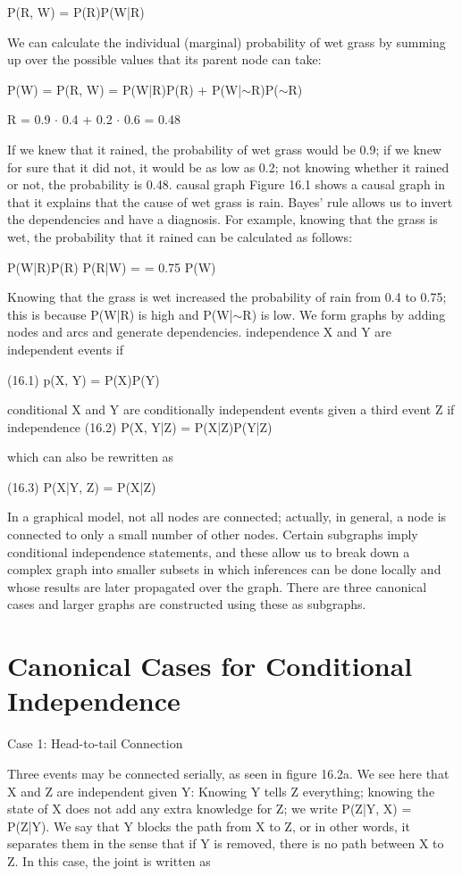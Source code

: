 P(R, W) = P(R)P(W|R)

We can calculate the individual (marginal) probability of wet grass by summing up over the possible values that its parent node can take:

P(W) = P(R, W) = P(W|R)P(R) + P(W|$\sim$R)P($\sim$R)

R = 0.9 $\cdot$ 0.4 + 0.2 $\cdot$ 0.6 = 0.48

If we knew that it rained, the probability of wet grass would be 0.9; if we knew for sure that it did not, it would be as low as 0.2; not knowing whether it rained or not, the probability is 0.48. causal graph Figure 16.1 shows a causal graph in that it explains that the cause of wet grass is rain. Bayes’ rule allows us to invert the dependencies and have a diagnosis. For example, knowing that the grass is wet, the probability that it rained can be calculated as follows:

P(W|R)P(R) P(R|W) = = 0.75 P(W)

Knowing that the grass is wet increased the probability of rain from 0.4 to 0.75; this is because P(W|R) is high and P(W|$\sim$R) is low. We form graphs by adding nodes and arcs and generate dependencies. independence X and Y are independent events if

(16.1) p(X, Y) = P(X)P(Y)

conditional X and Y are conditionally independent events given a third event Z if independence (16.2) P(X, Y|Z) = P(X|Z)P(Y|Z)

which can also be rewritten as

(16.3) P(X|Y, Z) = P(X|Z)

In a graphical model, not all nodes are connected; actually, in general, a node is connected to only a small number of other nodes. Certain subgraphs imply conditional independence statements, and these allow us to break down a complex graph into smaller subsets in which inferences can be done locally and whose results are later propagated over the graph. There are three canonical cases and larger graphs are constructed using these as subgraphs.

\section{Canonical Cases for Conditional Independence}

Case 1: Head-to-tail Connection

Three events may be connected serially, as seen in figure 16.2a. We see here that X and Z are independent given Y: Knowing Y tells Z everything; knowing the state of X does not add any extra knowledge for Z; we write P(Z|Y, X) = P(Z|Y). We say that Y blocks the path from X to Z, or in other words, it separates them in the sense that if Y is removed, there is no path between X to Z. In this case, the joint is written as

